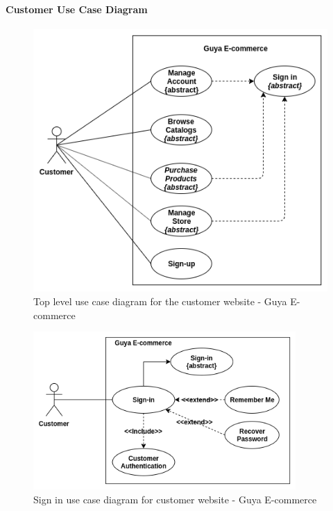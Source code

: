 \paragraph{Customer Use Case Diagram}
\clearpage
\begin{figure}
\includegraphics[width=15cm,keepaspectratio]{usecases/customer_top_level_usecase}
\caption{Top level use case diagram for the customer website - Guya E-commerce}
\end{figure}

\begin{figure}[!ht]
\centering
\includegraphics[width=10cm,keepaspectratio]{usecases/signin_usecase}
\caption{Sign in use case diagram for customer website - Guya E-commerce}
\end{figure}

